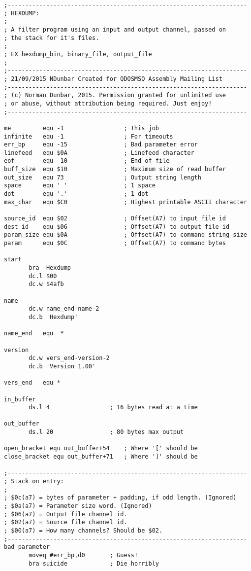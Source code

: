 \begin{lstlisting}[firstnumber=1,caption={Hexdump Utility}]
;--------------------------------------------------------------------
; HEXDUMP:
;
; A filter program using an input and output channel, passed on
; the stack for it's files.
; 
; EX hexdump_bin, binary_file, output_file
;
;--------------------------------------------------------------------
; 21/09/2015 NDunbar Created for QDOSMSQ Assembly Mailing List
;--------------------------------------------------------------------
; (c) Norman Dunbar, 2015. Permission granted for unlimited use
; or abuse, without attribution being required. Just enjoy!
;--------------------------------------------------------------------

me         equ -1                 ; This job
infinite   equ -1                 ; For timeouts
err_bp     equ -15                ; Bad parameter error
linefeed   equ $0A                ; Linefeed character
eof        equ -10                ; End of file
buff_size  equ $10                ; Maximum size of read buffer
out_size   equ 73                 ; Output string length
space      equ ' '                ; 1 space
dot        equ '.'                ; 1 dot
max_char   equ $C0                ; Highest printable ASCII character

source_id  equ $02                ; Offset(A7) to input file id
dest_id    equ $06                ; Offset(A7) to output file id
param_size equ $0A                ; Offset(A7) to command string size
param      equ $0C                ; Offset(A7) to command bytes

start      
       bra  Hexdump
       dc.l $00
       dc.w $4afb

name       
       dc.w name_end-name-2
       dc.b 'Hexdump'

name_end   equ  *

version    
       dc.w vers_end-version-2
       dc.b 'Version 1.00'

vers_end   equ *

in_buffer  
       ds.l 4                 ; 16 bytes read at a time

out_buffer 
       ds.l 20                ; 80 bytes max output

open_bracket equ out_buffer+54    ; Where '[' should be
close_bracket equ out_buffer+71   ; Where ']' should be

;--------------------------------------------------------------------
; Stack on entry:
;
; $0c(a7) = bytes of parameter + padding, if odd length. (Ignored)
; $0a(a7) = Parameter size word. (Ignored)
; $06(a7) = Output file channel id.
; $02(a7) = Source file channel id.
; $00(a7) = How many channels? Should be $02.
;--------------------------------------------------------------------
bad_parameter
       moveq #err_bp,d0       ; Guess!
       bra suicide            ; Die horribly


\end{lstlisting}

